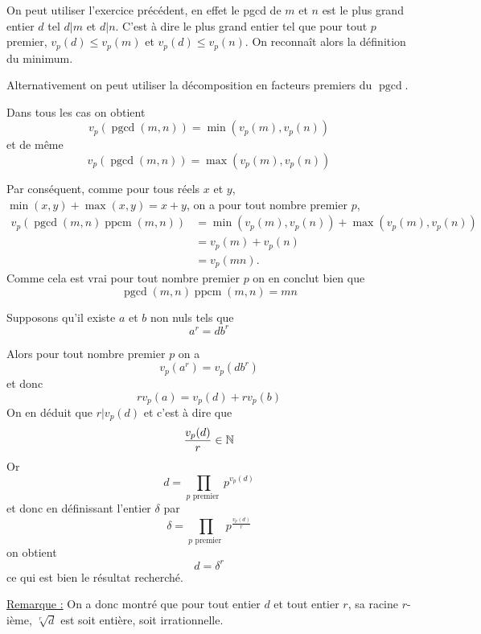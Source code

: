 \begin{sol}
On peut utiliser l'exercice précédent, en effet le pgcd de $m$ et $n$ est le plus grand entier $d$ tel $d |m$ et $d| n$. C'est à dire le plus grand entier tel que pour tout $p$ premier, $v_p(d)\le v_p(m)$ et $v_p(d) \le v_p(n)$. On reconnaît alors la définition du minimum.

Alternativement on peut utiliser la décomposition en facteurs premiers du $\operatorname{pgcd}$.

Dans tous les cas on obtient
$$\boxed{v_p\left(\operatorname{pgcd}(m,n)\right) = \min \left(v_p(m),v_p(n)\right)}$$
et de même
$$\boxed{v_p\left(\operatorname{pgcd}(m,n)\right) = \max \left(v_p(m),v_p(n)\right)}$$

Par conséquent, comme pour tous réels $x$ et $y$, $\min(x,y) + \max(x,y) = x+y$, on a pour tout nombre premier $p$,
$$\begin{aligned}
        v_p(\operatorname{pgcd}(m,n) \operatorname{ppcm}(m,n)) & = \min \left(v_p(m),v_p(n)\right) +\max \left(v_p(m),v_p(n)\right) \\
                                    & = v_p(m) + v_p(n)                                                  \\
                                    & = v_p(mn).
    \end{aligned}$$
Comme cela est vrai pour tout nombre premier $p$ on en conclut bien que
$$\boxed{\operatorname{pgcd}(m,n) \operatorname{ppcm}(m,n) = m n}$$
\end{sol}


\begin{sol}
Supposons qu'il existe $a$ et $b$ non nuls tels que
$$a^r = d b^r$$

Alors pour tout nombre premier $p$ on a
$$v_p(a^r) = v_p(d b^r)$$
et donc
$$r v_p(a) = v_p(d)+r v_p(b)$$
On en déduit que $r | v_p(d)$ et c'est à dire que
$$\frac{v_p(d)}{r} \in \mathbb N$$
Or
$$ d = \prod_{ p \text{ premier }} p^{v_p(d)}$$
et donc en définissant l'entier $\delta$ par
$$ \delta= \prod_{ p \text{ premier }} p^{\frac{v_p(d)}{r}}$$
on obtient
$$ \boxed{d = \delta^r}$$
ce qui est bien le résultat recherché.

\underline{Remarque :}
On a donc montré que pour tout entier $d$ et tout entier $r$, sa racine $r$-ième,  $\sqrt[r]{d}$ est soit entière, soit irrationnelle.
\end{sol}


